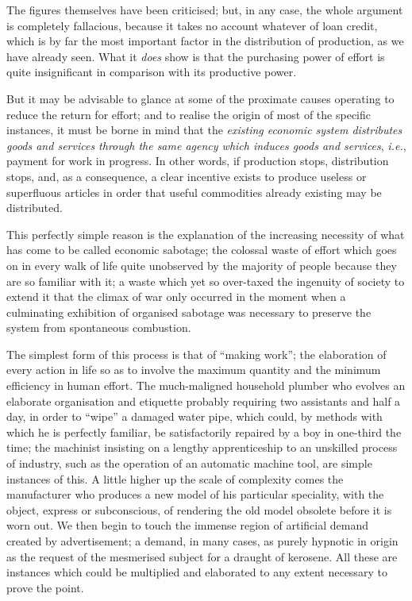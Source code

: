 \documentclass{book}
\begin{document}
The figures themselves have been criticised; but, in any case, the whole argument is completely fallacious, because it takes no account whatever of loan credit, which is by far the most important factor in the distribution of production, as we have already seen. What it \emph{does} show is that the purchasing power of effort is quite insignificant in comparison with its productive power.

But it may be advisable to glance at some of the proximate causes operating to reduce the return for effort; and to realise the origin of most of the specific instances, it must be borne in mind that the \emph{existing economic system distributes goods and services through the same agency which induces goods and services}, \emph{i.e.}, payment for work in progress. In other words, if production stops, distribution stops, and, as a consequence, a clear incentive exists to produce useless or superfluous articles in order that useful commodities already existing may be distributed.

This perfectly simple reason is the explanation of the increasing necessity of what has come to be called economic sabotage; the colossal waste of effort which goes on in every walk of life quite unobserved by the majority of people because they are so familiar with it; a waste which yet so over-taxed the ingenuity of society to extend it that the climax of war only occurred in the moment when a culminating exhibition of organised sabotage was necessary to preserve the system from spontaneous combustion.

The simplest form of this process is that of “making work”; the elaboration of every action in life so as to involve the maximum quantity and the minimum efficiency in human effort. The much-maligned household plumber who evolves an elaborate organisation and etiquette probably requiring two assistants and half a day, in order to “wipe” a damaged water pipe, which could, by methods with which he is perfectly familiar, be satisfactorily repaired by a boy in one-third the time; the machinist insisting on a lengthy apprenticeship to an unskilled process of industry, such as the operation of an automatic machine tool, are simple instances of this. A little higher up the scale of complexity comes the manufacturer who produces a new model of his particular speciality, with the object, express or subconscious, of rendering the old model obsolete before it is worn out. We then begin to touch the immense region of artificial demand created by advertisement; a demand, in many cases, as purely hypnotic in origin as the request of the mesmerised subject for a draught of kerosene. All these are instances which could be multiplied and elaborated to any extent necessary to prove the point.
\end{document}

